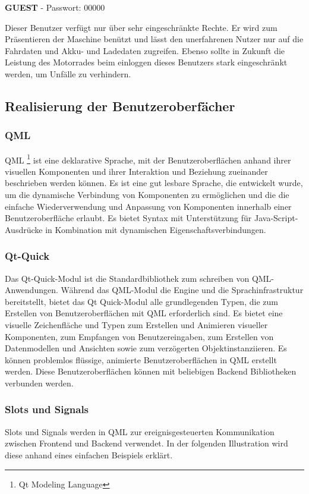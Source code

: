 {\small \textbf{GUEST}} - Passwort: 00000\\ \vspace{2mm}

Dieser Benutzer verfügt nur über sehr eingeschränkte Rechte. Er wird zum Präsentieren der Maschine benützt und lässt den unerfahrenen Nutzer nur auf die Fahrdaten und Akku- und Ladedaten zugreifen. Ebenso sollte in Zukunft die Leistung des Motorrades beim einloggen dieses Benutzers stark eingeschränkt werden, um Unfälle zu verhindern.

\newpage

\subsection{Realisierung der Benutzeroberfächer}

\subsubsection{QML} \label{sec:qml}
QML \footnote{Qt Modeling Language} ist eine deklarative Sprache, mit der Benutzeroberflächen anhand ihrer visuellen Komponenten und ihrer Interaktion und Beziehung zueinander beschrieben werden können. Es ist eine gut lesbare Sprache, die entwickelt wurde, um die dynamische Verbindung von Komponenten zu ermöglichen und die die einfache Wiederverwendung und Anpassung von Komponenten innerhalb einer Benutzeroberfläche erlaubt. Es bietet  Syntax mit Unterstützung für Java-Script-Ausdrücke in Kombination mit dynamischen Eigenschaftsverbindungen.

\subsubsection{Qt-Quick}
Das Qt-Quick-Modul ist die Standardbibliothek zum schreiben von QML-Anwendungen. Während das QML-Modul die Engine und die Sprachinfrastruktur bereitstellt, bietet das Qt Quick-Modul alle grundlegenden Typen, die zum Erstellen von Benutzeroberflächen mit QML erforderlich sind. Es bietet eine visuelle Zeichenfläche und Typen zum Erstellen und Animieren visueller Komponenten, zum Empfangen von Benutzereingaben, zum Erstellen von Datenmodellen und Ansichten sowie zum verzögerten Objektinstanziieren. Es können problemlos flüssige, animierte Benutzeroberflächen in QML erstellt werden. Diese Benutzeroberflächen können mit beliebigen Backend Bibliotheken verbunden werden.

\subsubsection{Slots und Signals} \label{sec:slots}
Slots und Signals werden in QML zur ereignisgesteuerten Kommunikation zwischen Frontend und Backend verwendet. In der folgenden Illustration wird diese anhand eines einfachen Beispiels erklärt.

